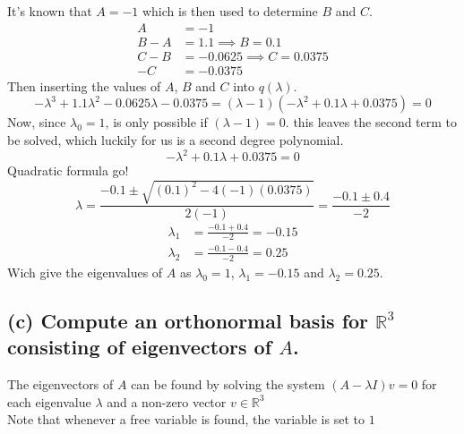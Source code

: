 \documentclass[12pt]{article}
\begin{document}
It's known that $A = -1$ which is then used to determine $B$ and  $C$.
\begin{align*}
    A &= -1 \\
    B - A &= 1.1 \implies B = 0.1 \\
    C - B &= -0.0625 \implies C = 0.0375 \\
    -C &= -0.0375
\end{align*}
Then inserting the values of $A$, $B$ and $C$ into $q(\lambda)$.
\begin{equation*}
    -\lambda^3 + 1.1\lambda^2 - 0.0625\lambda - 0.0375 = (\lambda - 1)(-\lambda^2 + 0.1\lambda + 0.0375) = 0
\end{equation*}
Now, since $\lambda_0 = 1$, is only possible if $(\lambda - 1) = 0$. this leaves the second term to be solved, which luckily for us is a second degree polynomial.
\begin{equation*}
    -\lambda^2 + 0.1\lambda + 0.0375 = 0
\end{equation*}
Quadratic formula go!
\begin{equation*}
    \lambda = \frac{-0.1 \pm \sqrt{(0.1)^2 - 4(-1)(0.0375)}}{2(-1)} = \frac{-0.1 \pm 0.4}{-2}
\end{equation*}
\begin{align*}
\lambda_1 &= \frac{-0.1 + 0.4}{-2} = -0.15 \\
\lambda_2 &= \frac{-0.1 - 0.4}{-2} = 0.25
\end{align*}
Wich give the eigenvalues of $A$ as $\lambda_0 = 1$, $\lambda_1 = -0.15$ and $\lambda_2 = 0.25$.
\subsection*{(c) Compute an orthonormal basis for $\mathbb{R}^3$ consisting of eigenvectors of $A$.}
The eigenvectors of $A$ can be found by solving the system $(A - \lambda I)v = 0$ for each eigenvalue $\lambda$ and a non-zero vector $v \in \mathbb{R}^3$\\
Note that whenever a free variable is found, the variable is set to $1$
\end{document}
